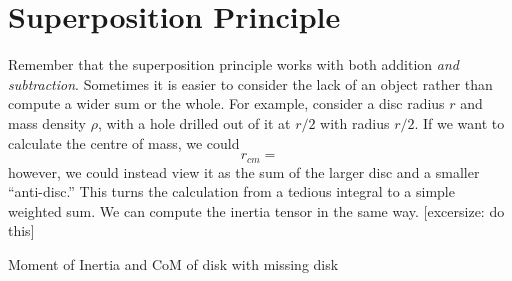 \section{Superposition Principle}
Remember that the superposition principle works with both addition \emph{and subtraction}. Sometimes it is easier to consider the lack of an object rather than compute a wider sum or the whole. For example, consider a disc radius \(r\) and mass density \(\rho\), with a hole drilled out of it at \(r/2\) with radius \(r/2\). If we want to calculate the centre of mass, we could 
\[r_{cm} = \]
however, we could instead view it as the sum of the larger disc and a smaller ``anti-disc.'' This turns the calculation from a tedious integral to a simple weighted sum. We can compute the inertia tensor in the same way. [excersize: do this]

Moment of Inertia and CoM of disk with missing disk

